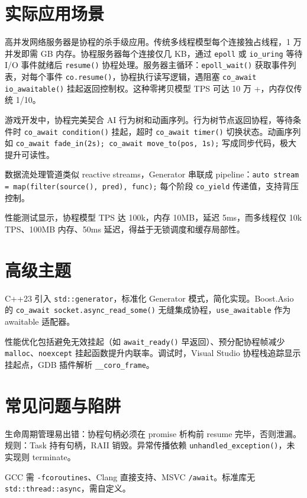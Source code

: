 \chapter{实际应用场景}
高并发网络服务器是协程的杀手级应用。传统多线程模型每个连接独占线程，1 万并发即需 GB 内存。协程服务器每个连接仅几 KB，通过 \texttt{epoll} 或 \texttt{io\_{}uring} 等待 I/O 事件就绪后 \texttt{resume()} 协程处理。服务器主循环：\texttt{epoll\_{}wait()} 获取事件列表，对每个事件 \texttt{co.resume()}，协程执行读写逻辑，遇阻塞 \texttt{co\_{}await io\_{}awaitable()} 挂起返回控制权。这种零拷贝模型 TPS 可达 10 万 +，内存仅传统 1/10。\par
游戏开发中，协程完美契合 AI 行为树和动画序列。行为树节点返回协程，等待条件时 \texttt{co\_{}await condition()} 挂起，超时 \texttt{co\_{}await timer()} 切换状态。动画序列如 \texttt{co\_{}await fade\_{}in(2s); co\_{}await move\_{}to(pos, 1s);} 写成同步代码，极大提升可读性。\par
数据流处理管道类似 reactive streams，Generator 串联成 pipeline：\texttt{auto stream = map(filter(source(), pred), func);} 每个阶段 \texttt{co\_{}yield} 传递值，支持背压控制。\par
性能测试显示，协程模型 TPS 达 100k，内存 10MB，延迟 5ms，而多线程仅 10k TPS、100MB 内存、50ms 延迟，得益于无锁调度和缓存局部性。\par
\chapter{高级主题}
C++23 引入 \texttt{std::generator}，标准化 Generator 模式，简化实现。Boost.Asio 的 \texttt{co\_{}await socket.async\_{}read\_{}some()} 无缝集成协程，\texttt{use\_{}awaitable} 作为 awaitable 适配器。\par
性能优化包括避免无效挂起（如 \texttt{await\_{}ready()} 早返回）、预分配协程帧减少 \texttt{malloc}、\texttt{noexcept} 挂起函数提升内联率。调试时，Visual Studio 协程栈追踪显示挂起点，GDB 插件解析 \texttt{\_{}\_{}coro\_{}frame}。\par
\chapter{常见问题与陷阱}
生命周期管理易出错：协程句柄必须在 promise 析构前 resume 完毕，否则泄漏。规则：Task 持有句柄，RAII 销毁。异常传播依赖 \texttt{unhandled\_{}exception()}，未实现则 terminate。\par
GCC 需 \texttt{-fcoroutines}、Clang 直接支持、MSVC \texttt{/await}。标准库无 \texttt{std::thread::async}，需自定义。\par
